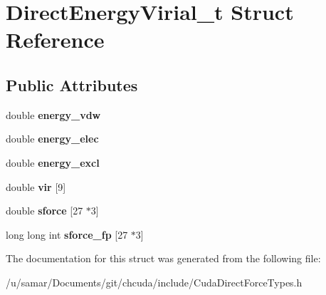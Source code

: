 \hypertarget{structDirectEnergyVirial__t}{}\section{Direct\+Energy\+Virial\+\_\+t Struct Reference}
\label{structDirectEnergyVirial__t}
\subsection*{Public Attributes}
\begin{DoxyCompactItemize}
\item 
\hypertarget{structDirectEnergyVirial__t_a766eb3fbc4d353a23175b39cf16e7171}{}\label{structDirectEnergyVirial__t_a766eb3fbc4d353a23175b39cf16e7171} 
double {\bfseries energy\+\_\+vdw}
\item 
\hypertarget{structDirectEnergyVirial__t_a474244166132994ed765eb89f0647a10}{}\label{structDirectEnergyVirial__t_a474244166132994ed765eb89f0647a10} 
double {\bfseries energy\+\_\+elec}
\item 
\hypertarget{structDirectEnergyVirial__t_acd709c92f3ca421f07b176a656e4af11}{}\label{structDirectEnergyVirial__t_acd709c92f3ca421f07b176a656e4af11} 
double {\bfseries energy\+\_\+excl}
\item 
\hypertarget{structDirectEnergyVirial__t_a8395a2ecf98bda394c1443c060361aae}{}\label{structDirectEnergyVirial__t_a8395a2ecf98bda394c1443c060361aae} 
double {\bfseries vir} \mbox{[}9\mbox{]}
\item 
\hypertarget{structDirectEnergyVirial__t_a732ef30319dcef3b27fdaecb9e17f2f1}{}\label{structDirectEnergyVirial__t_a732ef30319dcef3b27fdaecb9e17f2f1} 
double {\bfseries sforce} \mbox{[}27 $\ast$3\mbox{]}
\item 
\hypertarget{structDirectEnergyVirial__t_afe9033e13c580c787ab064beba9731ec}{}\label{structDirectEnergyVirial__t_afe9033e13c580c787ab064beba9731ec} 
long long int {\bfseries sforce\+\_\+fp} \mbox{[}27 $\ast$3\mbox{]}
\end{DoxyCompactItemize}


The documentation for this struct was generated from the following file\+:\begin{DoxyCompactItemize}
\item 
/u/samar/\+Documents/git/chcuda/include/Cuda\+Direct\+Force\+Types.\+h\end{DoxyCompactItemize}
